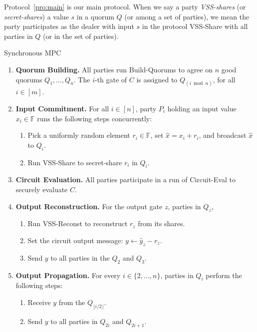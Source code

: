 \documentclass[11pt,letter]{article}
\newcommand{\alg}[1]{\mbox{\textsf{#1}}}
\newcommand{\mask}[1]{\widehat{#1}}
\newcommand{\F}{\mathbb{F}}
\theoremstyle{mytheoremstyle}
\let\savedCaption=\caption
\renewcommand*{\caption}[1]{\savedCaption[#1]{~#1}}
\newcommand{\algfont}{}
\newcommand{\vssSh}{\textsf{VSS-Share}\xspace}
\newcommand{\vssRec}{\textsf{VSS-Reconst}\xspace}
\newcommand{\ce}{\textsf{Circuit-Eval}\xspace}
\begin{document}
\smallskip
\mbox{Protocol~\ref{pro:main}} is our main protocol. When we say a party \emph{VSS-shares} (or \emph{secret-shares}) a value $s$ in a quorum $Q$ (or among a set of parties), we mean the party participates as the dealer with input $s$ in the protocol \alg{VSS-Share} with all parties in $Q$ (or in the set of parties).

\begin{algorithm}
	\caption{Synchronous MPC}\label{pro:main}
	\medskip
	\algfont
	\begin{enumerate}
		\item \textbf{Quorum Building.} All parties run \textsf{Build-Quorums} to agree on $n$ good quorums $Q_{1},...,Q_{n}$. The $i$-th gate of $C$ is assigned to $Q_{(i \bmod n)}$, for all $i \in [m]$.
		\item \textbf{Input Commitment.} For all $i \in [n]$, party $P_i$ holding an input value $x_i \in \F$ runs the following steps concurrently:
		
		\smallskip		
		\begin{enumerate}
			\item Pick a uniformly random element $r_i \in \F$, set $\mask{x} = x_i + r_i$, and broadcast  $\mask{x}$ to $Q_i$.
			\item Run \vssSh to secret-share $r_i$ in $Q_i$.
\end{enumerate}
		
		\item \textbf{Circuit Evaluation.} All parties participate in a run of \ce to securely evaluate $C$.
		
		\item \textbf{Output Reconstruction.} For the output gate $z$, parties in $Q_z$,
		
		\smallskip
		\begin{enumerate}
			\item Run \vssRec to reconstruct $r_z$ from its shares.
			\item Set the circuit output message: $y \gets \mask{y}_z - r_z$.
			\item Send $y$ to all parties in the $Q_2$ and $Q_3$.			
		\end{enumerate}
		
		\item \textbf{Output Propagation.} For every $i \in \{2,...,n\}$, parties in $Q_i$ perform the following steps:
		\smallskip
		\begin{enumerate}
			\item Receive $y$ from the $Q_{\lfloor i/2\rfloor}$.
			\item Send $y$ to all parties in $Q_{2i}$ and	$Q_{2i+1}$.
		\end{enumerate}		
	\end{enumerate}
\end{algorithm}
\end{document}
